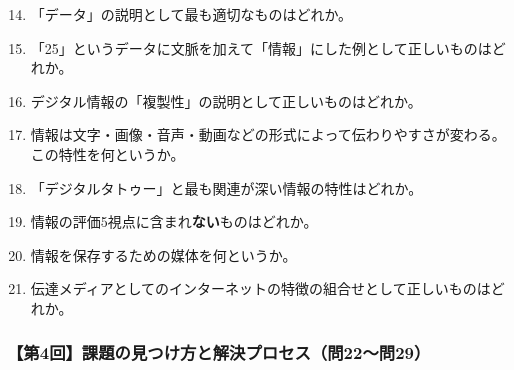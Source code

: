 \documentclass[b4paper,7pt,twocolumn,landscape]{jsarticle}
\begin{document}
\begin{enumerate}
\setcounter{enumi}{13}
\item 「データ」の説明として最も適切なものはどれか。\\

\item 「25」というデータに文脈を加えて「情報」にした例として正しいものはどれか。\\

\item デジタル情報の「複製性」の説明として正しいものはどれか。\\

\item 情報は文字・画像・音声・動画などの形式によって伝わりやすさが変わる。この特性を何というか。\\

\item 「デジタルタトゥー」と最も関連が深い情報の特性はどれか。\\

\item 情報の評価5視点に含まれ\textbf{ない}ものはどれか。\\

\item 情報を保存するための媒体を何というか。\\

\item 伝達メディアとしてのインターネットの特徴の組合せとして正しいものはどれか。\\
\end{enumerate}

\subsubsection*{【第4回】課題の見つけ方と解決プロセス（問22〜問29）}
\end{document}
